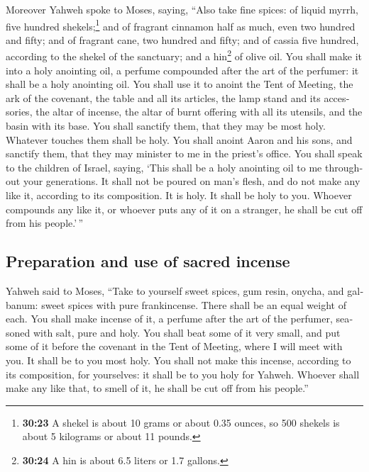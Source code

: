 \begin{paracol}{2}
\begin{otherlanguage}{english}
 Moreover Yahweh spoke to Moses, saying, 
``Also take fine spices: of liquid myrrh, five hundred
shekels;\footnote{\textbf{30:23} A shekel is about 10 grams or about
  0.35 ounces, so 500 shekels is about 5 kilograms or about 11 pounds.}
and of fragrant cinnamon half as much, even two hundred and fifty; and
of fragrant cane, two hundred and fifty;  and of cassia
five hundred, according to the shekel of the sanctuary; and a
hin\footnote{\textbf{30:24} A hin is about 6.5 liters or 1.7 gallons.}
of olive oil.  You shall make it into a holy anointing
oil, a perfume compounded after the art of the perfumer: it shall be a
holy anointing oil.  You shall use it to anoint the Tent
of Meeting, the ark of the covenant,  the table and all
its articles, the lamp stand and its accessories, the altar of incense,
 the altar of burnt offering with all its utensils, and
the basin with its base.  You shall sanctify them, that
they may be most holy. Whatever touches them shall be holy.
 You shall anoint Aaron and his sons, and sanctify them,
that they may minister to me in the priest's office.  You
shall speak to the children of Israel, saying, `This shall be a holy
anointing oil to me throughout your generations.  It
shall not be poured on man's flesh, and do not make any like it,
according to its composition. It is holy. It shall be holy to you.
 Whoever compounds any like it, or whoever puts any of it
on a stranger, he shall be cut off from his people.'\,''

\hypertarget{preparation-and-use-of-sacred-incense}{%
\subsection{Preparation and use of sacred
incense}\label{preparation-and-use-of-sacred-incense}}

 Yahweh said to Moses, ``Take to yourself sweet spices,
gum resin, onycha, and galbanum: sweet spices with pure frankincense.
There shall be an equal weight of each.  You shall make
incense of it, a perfume after the art of the perfumer, seasoned with
salt, pure and holy.  You shall beat some of it very
small, and put some of it before the covenant in the Tent of Meeting,
where I will meet with you. It shall be to you most holy.
 You shall not make this incense, according to its
composition, for yourselves: it shall be to you holy for Yahweh.
 Whoever shall make any like that, to smell of it, he
shall be cut off from his people.''


\end{otherlanguage}
\end{paracol}
